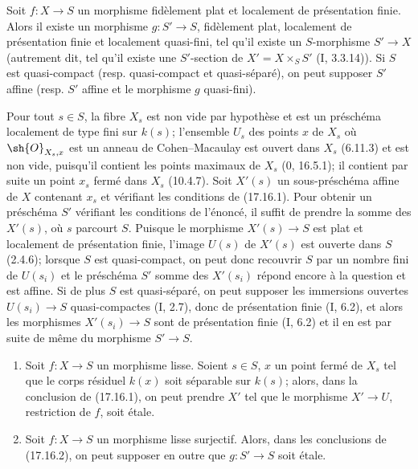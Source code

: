 \begin{corollary}[17.16.2]
\label{IV.17.16.2}
Soit $f:X\to S$ un morphisme fidèlement plat et localement de présentation finie. Alors il existe un morphisme $g:S'\to S$, fidèlement plat, localement de présentation finie et localement quasi-fini, tel qu'il existe un $S$-morphisme $S'\to X$ (autrement dit, tel qu'il existe une $S'$-section de $X'=X\times_S S'$ (I, 3.3.14)). Si $S$ est quasi-compact (resp. quasi-compact et quasi-séparé), on peut supposer $S'$ affine (resp. $S'$ affine et le morphisme $g$ quasi-fini).
\end{corollary}

Pour tout $s\in S$, la fibre $X_s$ est non vide par hypothèse et est un préschéma localement de type fini sur $k(s)$; l'ensemble $U_s$ des points $x$ de $X_s$ où $\sh{O}_{X_s,x}$ est un anneau de Cohen--Macaulay est ouvert dans $X_s$ (6.11.3) et est non vide, puisqu'il contient les points maximaux de $X_s$ (0, 16.5.1); il contient par suite un point $x_s$ fermé dans $X_s$ (10.4.7). Soit $X'(s)$ un sous-préschéma affine de $X$ contenant $x_s$ et vérifiant les conditions de (17.16.1). Pour obtenir un préschéma $S'$ vérifiant les conditions de l'énoncé, il suffit de prendre la somme des $X'(s)$, où $s$ parcourt $S$. Puisque le morphisme $X'(s)\to S$ est plat et localement de présentation finie, l'image $U(s)$ de $X'(s)$ est ouverte dans $S$ (2.4.6); lorsque $S$ est quasi-compact, on peut donc recouvrir $S$ par un nombre fini de $U(s_i)$ et le préschéma $S'$ somme des $X'(s_i)$ répond encore à la question et est affine. Si de plus $S$ est quasi-séparé, on peut supposer les immersions ouvertes $U(s_i)\to S$ quasi-compactes (I, 2.7), donc de présentation finie (I, 6.2), et alors les morphismes $X'(s_i)\to S$ sont de présentation finie (I, 6.2) et il en est par suite de même du morphisme $S'\to S$.

\begin{corollary}[17.16.3]
\label{IV.17.16.3}
\begin{enumerate}
  \item[(i)] Soit $f:X\to S$ un morphisme lisse. Soient $s\in S$, $x$ un point fermé de $X_s$ tel que le corps résiduel $k(x)$ soit séparable sur $k(s)$; alors, dans la conclusion de (17.16.1), on peut prendre $X'$ tel que le morphisme $X'\to U$, restriction de $f$, soit étale.
  \item[(ii)] Soit $f:X\to S$ un morphisme lisse surjectif. Alors, dans les conclusions de (17.16.2), on peut supposer en outre que $g:S'\to S$ soit étale.
\end{enumerate}
\end{corollary}

